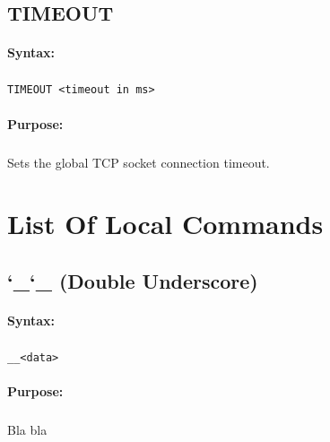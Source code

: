\subsection{TIMEOUT}

\paragraph{Syntax:}
\subparagraph{}
\texttt{TIMEOUT <timeout in ms>}

\paragraph{Purpose:}
\subparagraph{}
Sets the global TCP socket connection timeout.



\newpage
\section{List Of Local Commands}

\subsection{\char`\_\char`\_ (Double Underscore)}

\paragraph{Syntax:}
\subparagraph{}
\texttt{\_\_<data>}

\paragraph{Purpose:}
\subparagraph{}
Bla bla